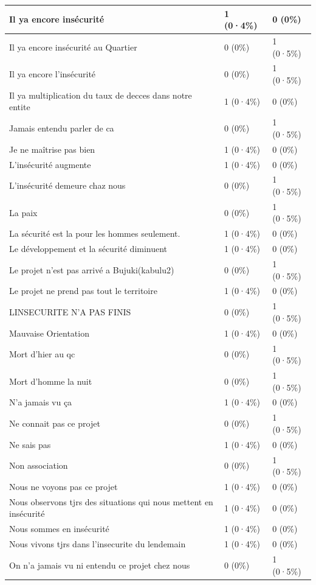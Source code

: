 \documentclass[
]{book}
\begin{document}
\begin{tabular}{l|l|l}
\hline
Il ya encore insécurité & 1 (0·4\%) & 0 (0\%)\\
\hline
Il ya encore insécurité au Quartier & 0 (0\%) & 1 (0·5\%)\\
\hline
Il ya encore l'insécurité & 0 (0\%) & 1 (0·5\%)\\
\hline
Il ya multiplication du taux de decces dans notre entite & 1 (0·4\%) & 0 (0\%)\\
\hline
Jamais entendu parler de ca & 0 (0\%) & 1 (0·5\%)\\
\hline
Je ne maîtrise pas bien & 1 (0·4\%) & 0 (0\%)\\
\hline
L'insécurité augmente & 1 (0·4\%) & 0 (0\%)\\
\hline
L'insécurité demeure chaz nous & 0 (0\%) & 1 (0·5\%)\\
\hline
La paix & 0 (0\%) & 1 (0·5\%)\\
\hline
La sécurité est la pour les hommes seulement. & 1 (0·4\%) & 0 (0\%)\\
\hline
Le développement et la sécurité diminuent & 1 (0·4\%) & 0 (0\%)\\
\hline
Le projet n'est pas arrivé a Bujuki(kabulu2) & 0 (0\%) & 1 (0·5\%)\\
\hline
Le projet ne prend pas tout le territoire & 1 (0·4\%) & 0 (0\%)\\
\hline
LINSECURITE N'A PAS FINIS & 0 (0\%) & 1 (0·5\%)\\
\hline
Mauvaise Orientation & 1 (0·4\%) & 0 (0\%)\\
\hline
Mort d'hier au qc & 0 (0\%) & 1 (0·5\%)\\
\hline
Mort d'homme la nuit & 0 (0\%) & 1 (0·5\%)\\
\hline
N'a jamais vu ça & 1 (0·4\%) & 0 (0\%)\\
\hline
Ne connait pas ce projet & 0 (0\%) & 1 (0·5\%)\\
\hline
Ne sais pas & 1 (0·4\%) & 0 (0\%)\\
\hline
Non association & 0 (0\%) & 1 (0·5\%)\\
\hline
Nous ne voyons pas ce projet & 1 (0·4\%) & 0 (0\%)\\
\hline
Nous observons tjrs des situations qui nous mettent en insécurité & 1 (0·4\%) & 0 (0\%)\\
\hline
Nous sommes en insécurité & 1 (0·4\%) & 0 (0\%)\\
\hline
Nous vivons tjrs dans l'insecurite du lendemain & 1 (0·4\%) & 0 (0\%)\\
\hline
On n'a jamais vu ni entendu ce projet chez nous & 0 (0\%) & 1 (0·5\%)\\

\end{tabular}
\end{document}
